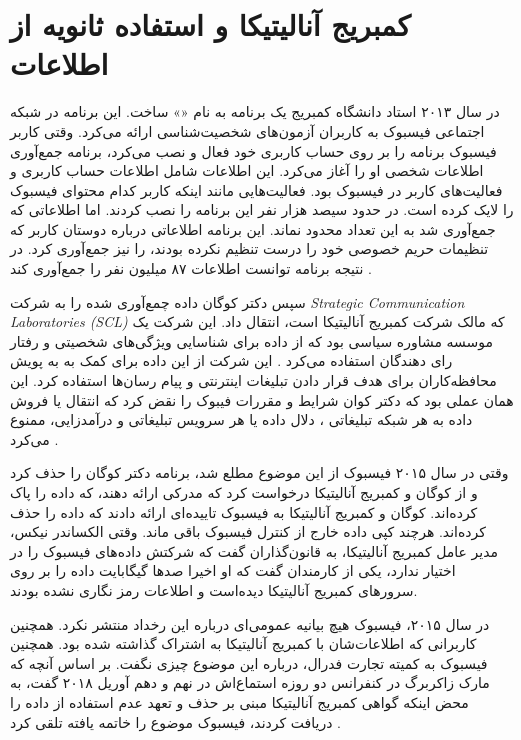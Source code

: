 \section{کمبریج آنالیتیکا و استفاده ثانویه از اطلاعات}
در سال ۲۰۱۳ استاد دانشگاه کمبریج یک برنامه به نام 
«»
ساخت. این برنامه در شبکه اجتماعی فیسبوک به کاربران 
آزمون‌های شخصیت‌شناسی ارائه می‌کرد. وقتی کاربر فیسبوک برنامه را بر روی حساب کاربری خود فعال و نصب
می‌کرد، برنامه جمع‌آوری اطلاعات شخصی او را آغاز می‌کرد. این اطلاعات شامل اطلاعات حساب کاربری و فعالیت‌های کاربر در فیسبوک
بود. فعالیت‌هایی مانند اینکه کاربر کدام محتوای فیسبوک را لایک کرده است. در حدود سیصد هزار نفر این 
برنامه را نصب کردند. اما اطلاعاتی که جمع‌آوری شد به این تعداد محدود نماند.  
این برنامه اطلاعاتی درباره دوستان کاربر که تنظیمات حریم خصوصی خود را درست  تنظیم نکرده بودند، را 
نیز جمع‌آوری کرد. در نتیجه برنامه توانست اطلاعات ۸۷ میلیون نفر را جمع‌آوری کند
\!\cite{kangFacebookSaysCambridge}.

سپس دکتر کوگان داده چمع‌آوری شده را به شرکت 
\textit{
  \gls{ Strategic Communication Laboratories (SCL)}
}
که مالک شرکت کمبریج آنالیتیکا است، انتقال داد. این شرکت یک موسسه مشاوره
سیاسی بود که از داده برای شناسایی ویژگی‌های شخصیتی و رفتار رای دهندگان
استفاده می‌کرد
\!\cite{rosenbergHowTrumpConsultants2018}. 
این شرکت از این داده برای کمک به به پویش محافظه‌کاران برای هدف
قرار دادن تبلیغات اینترنتی و پیام رسان‌ها استفاده کرد. این همان عملی 
بود که دکتر کوان شرایط و مقررات فیبوک را نقض کرد که انتقال یا 
فروش داده به هر شبکه تبلیغاتی ، دلال داده یا هر سرویس تبلیغاتی 
و درآمد‌زایی، ممنوع می‌کرد
\!\cite{granvilleFacebookCambridgeAnalytica2018}. 

وقتی در سال ۲۰۱۵ فیسبوک از این موضوع مطلع شد، برنامه دکتر کوگان 
را حذف  کرد و از کوگان و کمبریج آنالیتیکا درخواست کرد که
مدرکی ارائه دهند، که داده را پاک کرده‌اند. کوگان و کمبریج آنالیتیکا
به فیسبوک تاییده‌ای ارائه دادند که داده را حذف کرده‌اند. هرچند  کپی داده
خارج از کنترل فیسبوک باقی ماند.  وقتی الکساندر نیکس، مدیر عامل
کمبریج آنالیتیکا، به قانون‌گذاران گفت که شرکتش داده‌های فیسبوک را در
اختیار ندارد، یکی از کارمندان گفت که او اخیرا صدها گیگابایت داده را
بر روی سرورهای کمبریج آنالیتیکا دیده‌است و اطلاعات رمز نگاری نشده بودند.

در سال ۲۰۱۵، فیسبوک هیچ بیانیه عمومی‌ای درباره این رخداد منتشر نکرد. همچنین
کاربرانی که اطلاعات‌شان با کمبریج آنالیتیکا به اشتراک گذاشته شده 
بود. همچنین فیسبوک به کمیته تجارت فدرال، درباره این موضوع
چیزی نگفت. بر اساس آنچه که مارک زاکربرگ در کنفرانس دو روزه
 استماع‌اش در نهم و دهم آوریل ۲۰۱۸ گفت، به محض اینکه گواهی کمبریج آنالیتیکا
 مبنی بر حذف و تعهد عدم استفاده از داده را دریافت کردند، فیسبوک
 موضوع را خاتمه یافته تلقی کرد
 \!\cite{spanFacebookCEOMark}. 

